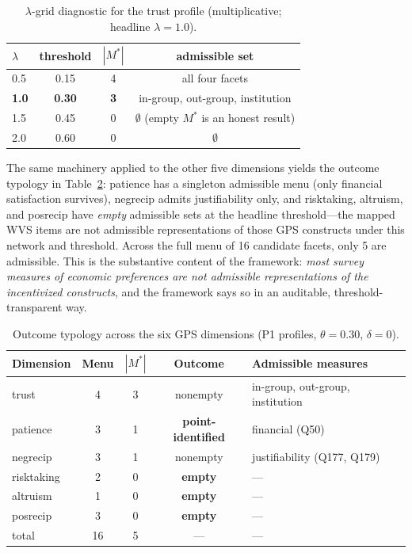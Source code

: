 \documentclass[11pt,letterpaper]{article}
\begin{document}
\begin{table}[h!]
\centering
\caption{$\lambda$-grid diagnostic for the trust profile (multiplicative; headline $\lambda=1.0$).}
\label{tab:thetagrid}
\scriptsize
\begin{tabular}{@{}lccc@{}}
\toprule
$\lambda$ & threshold & $|M^*|$ & admissible set \\
\midrule
0.5 & 0.15 & 4 & all four facets \\
\textbf{1.0} & \textbf{0.30} & \textbf{3} & in-group, out-group, institution \\
1.5 & 0.45 & 0 & $\emptyset$ (empty $M^*$ is an honest result) \\
2.0 & 0.60 & 0 & $\emptyset$ \\
\bottomrule
\end{tabular}
\end{table}

The same machinery applied to the other five dimensions yields the outcome typology in Table~\ref{tab:typology}: patience has a singleton admissible menu (only financial satisfaction survives), negrecip admits justifiability only, and risktaking, altruism, and posrecip have \emph{empty} admissible sets at the headline threshold---the mapped WVS items are not admissible representations of those GPS constructs under this network and threshold. Across the full menu of 16 candidate facets, only 5 are admissible. This is the substantive content of the framework: \emph{most survey measures of economic preferences are not admissible representations of the incentivized constructs}, and the framework says so in an auditable, threshold-transparent way.

\begin{table}[h!]
\centering
\caption{Outcome typology across the six GPS dimensions (P1 profiles, $\theta=0.30$, $\delta=0$).}
\label{tab:typology}
\scriptsize
\begin{tabular}{@{}lcccl@{}}
\toprule
\textbf{Dimension} & \textbf{Menu} & \textbf{$|M^*|$} & \textbf{Outcome} & \textbf{Admissible measures} \\
\midrule
trust       & 4 & 3 & nonempty  & in-group, out-group, institution \\
patience    & 3 & 1 & \textbf{point-identified} & financial (Q50) \\
negrecip    & 3 & 1 & nonempty  & justifiability (Q177, Q179) \\
risktaking  & 2 & 0 & \textbf{empty}  & --- \\
altruism    & 1 & 0 & \textbf{empty}  & --- \\
posrecip    & 3 & 0 & \textbf{empty}  & --- \\
\midrule
total       & 16 & 5 & --- & --- \\
\bottomrule
\end{tabular}
\end{table}
\end{document}
